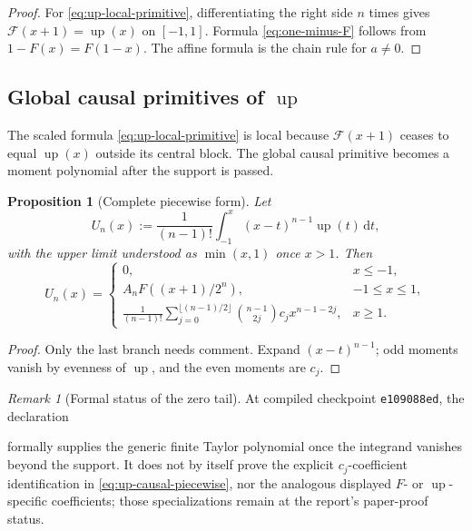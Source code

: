 \documentclass[11pt]{article}
\newtheorem{proposition}[theorem]{Proposition}
\theoremstyle{definition}
\theoremstyle{remark}
\newtheorem{remark}[theorem]{Remark}
\DeclareMathOperator{\upf}{up}
\newcommand{\dd}{\,\mathrm d}
\newcommand{\FF}{\mathscr F}
\begin{document}
\begin{proof}
For \eqref{eq:up-local-primitive}, differentiating the right side \(n\) times gives
\(\FF(x+1)=\upf(x)\) on \([-1,1]\).  Formula \eqref{eq:one-minus-F} follows from
\(1-F(x)=F(1-x)\).  The affine formula is the chain rule for \(a\ne0\).
\end{proof}

\subsection{Global causal primitives of \(\upf\)}

The scaled formula \eqref{eq:up-local-primitive} is local because \(\FF(x+1)\) ceases
to equal \(\upf(x)\) outside its central block.  The global causal primitive becomes a
moment polynomial after the support is passed.

\begin{proposition}[Complete piecewise form]
\label{prop:up-causal}
Let
\[
 U_n(x):=\frac1{(n-1)!}\int_{-1}^{x}(x-t)^{n-1}\upf(t)\dd t,
\]
with the upper limit understood as \(\min(x,1)\) once \(x>1\).  Then
\begin{equation}
 U_n(x)=
 \begin{cases}
  0,&x\le-1,\\[1mm]
  A_nF((x+1)/2^n),&-1\le x\le1,\\[1mm]
  \displaystyle
  \frac1{(n-1)!}
  \sum_{j=0}^{\lfloor(n-1)/2\rfloor}
    \binom{n-1}{2j}c_jx^{n-1-2j},&x\ge1.
 \end{cases}                                               \label{eq:up-causal-piecewise}
\end{equation}
\end{proposition}

\begin{proof}
Only the last branch needs comment.  Expand \((x-t)^{n-1}\); odd moments vanish by
evenness of \(\upf\), and the even moments are \(c_j\).
\end{proof}

\begin{remark}[Formal status of the zero tail]
At compiled checkpoint \texttt{e109088ed}, the declaration
\begin{center}
\end{center}
formally supplies the generic finite Taylor polynomial once the integrand vanishes beyond
the support.  It does not by itself prove the explicit \(c_j\)-coefficient identification in
\eqref{eq:up-causal-piecewise}, nor the analogous displayed \(F\)- or
\(\upf\)-specific coefficients; those specializations remain at the report's paper-proof
status.
\end{remark}
\end{document}
